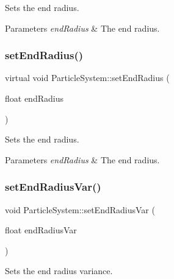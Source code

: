 Sets the end radius.


\begin{DoxyParams}{Parameters}
{\em end\+Radius} & The end radius. \\
\hline
\end{DoxyParams}
\mbox{\label{classParticleSystem_a8692a22d320978b6b1ac256960abad4c}} 
\subsubsection{\texorpdfstring{set\+End\+Radius()}{setEndRadius()}\hspace{0.1cm}{\footnotesize\ttfamily [2/2]}}
{\footnotesize\ttfamily virtual void Particle\+System\+::set\+End\+Radius (\begin{DoxyParamCaption}\item[{float}]{end\+Radius }\end{DoxyParamCaption})\hspace{0.3cm}{\ttfamily [virtual]}}

Sets the end radius.


\begin{DoxyParams}{Parameters}
{\em end\+Radius} & The end radius. \\
\hline
\end{DoxyParams}
\mbox{\label{classParticleSystem_acc0b6eccf9a7847260a57b4c0cc5a91e}} 
\subsubsection{\texorpdfstring{set\+End\+Radius\+Var()}{setEndRadiusVar()}\hspace{0.1cm}{\footnotesize\ttfamily [1/2]}}
{\footnotesize\ttfamily void Particle\+System\+::set\+End\+Radius\+Var (\begin{DoxyParamCaption}\item[{float}]{end\+Radius\+Var }\end{DoxyParamCaption})\hspace{0.3cm}{\ttfamily [virtual]}}

Sets the end radius variance.


